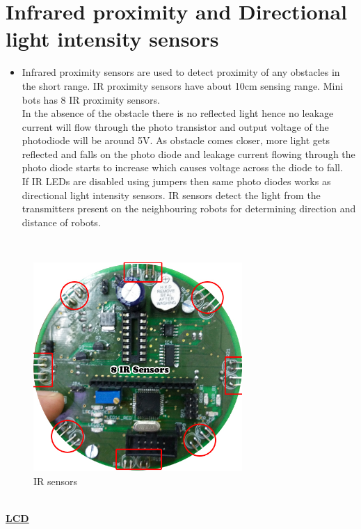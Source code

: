 \documentclass[a4paper,12pt,oneside]{book}
\begin{document}
\chapter{Infrared proximity and Directional light intensity sensors}
\begin{itemize}
	\item {
		Infrared proximity sensors are used to detect proximity of any obstacles in the short range. IR
		proximity sensors have about 10cm sensing range. Mini bots has 8 IR proximity sensors.\\
		In the absence of the obstacle there is no reflected light hence no leakage current will flow
		through the photo transistor and output voltage of the photodiode will be around 5V. As obstacle
		comes closer, more light gets reflected and falls on the photo diode and leakage current flowing
		through the photo diode starts to increase which causes voltage across the diode to fall.\\
		If IR LEDs are disabled using jumpers then same photo diodes works as directional light
		intensity sensors.
		IR sensors detect the light from the transmitters present on the neighbouring robots for determining direction and distance of robots.\\
	}
	\end{itemize}

	\hfill\\
	\begin{figure}[h!]
		\caption{IR sensors}
		\includegraphics[width=300px]{./HardwareManual/IR_Sensor.jpg}
	\end{figure}	
	\hfill\\
	\newpage
	\underline{\textbf{\Large{LCD}}}
		
\end{document}
